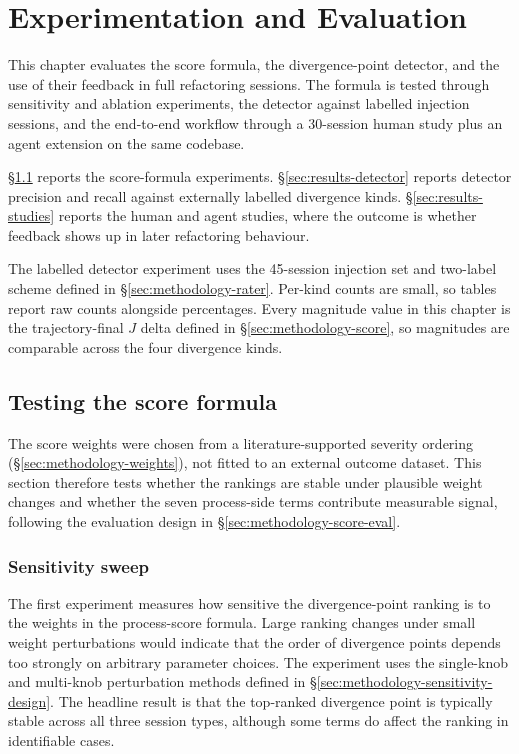 \chapter{Experimentation and Evaluation}
\label{ch:results}

This chapter evaluates the score formula, the divergence-point detector, and the use of their feedback in full refactoring sessions. The formula is tested through sensitivity and ablation experiments, the detector against labelled injection sessions, and the end-to-end workflow through a 30-session human study plus an agent extension on the same codebase.

\S\ref{sec:results-metric} reports the score-formula experiments. \S\ref{sec:results-detector} reports detector precision and recall against externally labelled divergence kinds. \S\ref{sec:results-studies} reports the human and agent studies, where the outcome is whether feedback shows up in later refactoring behaviour.

The labelled detector experiment uses the 45-session injection set and two-label scheme defined in \S\ref{sec:methodology-rater}. Per-kind counts are small, so tables report raw counts alongside percentages. Every magnitude value in this chapter is the trajectory-final $J$ delta defined in \S\ref{sec:methodology-score}, so magnitudes are comparable across the four divergence kinds.

\section{Testing the score formula}
\label{sec:results-metric}

The score weights were chosen from a literature-supported severity ordering (\S\ref{sec:methodology-weights}), not fitted to an external outcome dataset. This section therefore tests whether the rankings are stable under plausible weight changes and whether the seven process-side terms contribute measurable signal, following the evaluation design in \S\ref{sec:methodology-score-eval}.

\subsection{Sensitivity sweep}
\label{sec:results-sensitivity}

The first experiment measures how sensitive the divergence-point ranking is to the weights in the process-score formula. Large ranking changes under small weight perturbations would indicate that the order of divergence points depends too strongly on arbitrary parameter choices. The experiment uses the single-knob and multi-knob perturbation methods defined in \S\ref{sec:methodology-sensitivity-design}. The headline result is that the top-ranked divergence point is typically stable across all three session types, although some terms do affect the ranking in identifiable cases.

